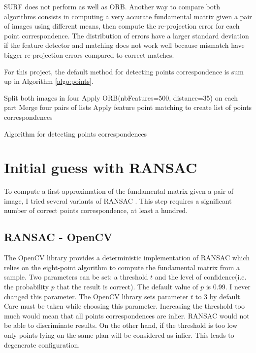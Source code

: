 \documentclass[11pt]{report}
\begin{document}
SURF does not perform as well as ORB. Another way to compare both algorithms consists in computing a very accurate fundamental matrix given a pair of images using different means, then compute the re-projection error for each point correspondence. The distribution of errors have a larger standard deviation if the feature detector and matching does not work well because mismatch have bigger re-projection errors compared to correct matches.

For this project, the default method for detecting points correspondence is sum up in Algorithm \ref{algo:points}.

\begin{algorithm}[H]
    Split both images in four\;
    Apply ORB(nbFeatures=500, distance=35) on each part\;
    Merge four pairs of lists\;
    Apply feature point matching to create list of points correspondences\;
  \caption{Algorithm for detecting points correspondences}
  \label{algo:points}
\end{algorithm}

\section{Initial guess with RANSAC}

To compute a first approximation of the fundamental matrix given a pair of image, I tried several variants of RANSAC \cite{Ransac81}. This step requires a significant number of correct points correspondence, at least a hundred.

\subsection{RANSAC - OpenCV}

The OpenCV library provides a deterministic implementation of RANSAC which relies on the eight-point algorithm to compute the fundamental matrix from a sample. Two parameters can be set: a threshold $t$ and the level of confidence(i.e. the probability $p$ that the result is correct). The default value of $p$ is 0.99. I never changed this parameter. The OpenCV library sets parameter $t$ to 3 by default. Care must be taken while choosing this parameter. Increasing the threshold too much would mean that all points correspondences are inlier. RANSAC would not be able to discriminate results. On the other hand, if the threshold is too low only points lying on the same plan will be considered as inlier. This leads to degenerate configuration.
\end{document}
